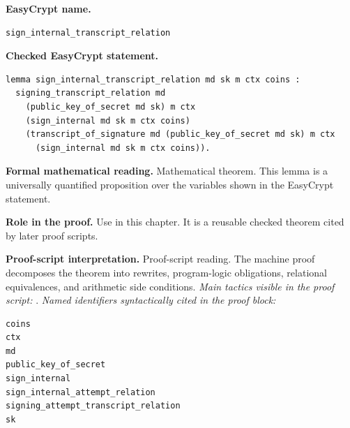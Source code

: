 \begin{formaltheorem}
\noindent\textbf{EasyCrypt name.}
\begin{lstlisting}[language=EasyCrypt,basicstyle=\ttfamily\scriptsize]
sign_internal_transcript_relation
\end{lstlisting}
\noindent\textbf{Checked EasyCrypt statement.}
\begin{lstlisting}[language=EasyCrypt,basicstyle=\ttfamily\scriptsize]
lemma sign_internal_transcript_relation md sk m ctx coins :
  signing_transcript_relation md
    (public_key_of_secret md sk) m ctx
    (sign_internal md sk m ctx coins)
    (transcript_of_signature md (public_key_of_secret md sk) m ctx
      (sign_internal md sk m ctx coins)).
\end{lstlisting}
\noindent\textbf{Formal mathematical reading.}
Mathematical theorem. This lemma is a universally quantified proposition over the variables shown in the EasyCrypt statement.

\noindent\textbf{Role in the proof.}
Use in this chapter. It is a reusable checked theorem cited by later proof scripts.

\noindent\textbf{Proof-script interpretation.}
Proof-script reading. The machine proof decomposes the theorem into rewrites, program-logic obligations, relational equivalences, and arithmetic side conditions.
\emph{Main tactics visible in the proof script:} .
\emph{Named identifiers syntactically cited in the proof block:}
\begin{lstlisting}[language=EasyCrypt,basicstyle=\ttfamily\scriptsize]
coins
ctx
md
public_key_of_secret
sign_internal
sign_internal_attempt_relation
signing_attempt_transcript_relation
sk
\end{lstlisting}

\end{formaltheorem}

